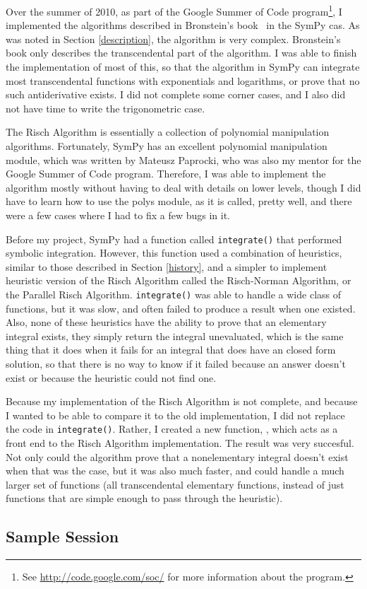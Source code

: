 Over the summer of 2010, as part of the Google Summer of Code
program\footnote{ See \url{http://code.google.com/soc/} for more
information about the program.}, I implemented the algorithms described
in Bronstein's book~\cite{bronstein2005symbolic} in the SymPy \gls{cas}.
As was noted in Section \ref{description}, the algorithm is very
complex. Bronstein's book only describes the \gls{transcendental} part
of the algorithm. I was able to finish the implementation of most of
this, so that the algorithm in SymPy can integrate most
\gls{transcendental} functions with exponentials and logarithms, or
prove that no such antiderivative exists.  I did not complete some
corner cases, and I also did not have time to write the trigonometric
case.

The Risch Algorithm is essentially a collection of polynomial
manipulation algorithms.  Fortunately, SymPy has an excellent polynomial
manipulation module, which was written by Mateusz Paprocki, who was also
my mentor for the Google Summer of Code program.  Therefore, I was able
to implement the algorithm mostly without having to deal with details on
lower levels, though I did have to learn how to use the polys module, as
it is called, pretty well, and there were a few cases where I had to fix
a few bugs in it.

Before my project, SymPy had a function called \texttt{integrate()} that
performed symbolic integration.  However, this function used a
combination of heuristics, similar to those described in Section
\ref{history}, and a simpler to implement heuristic version of the Risch
Algorithm called the Risch-Norman Algorithm, or the Parallel Risch
Algorithm.  \texttt{integrate()} was able to handle a wide class of
functions, but it was slow, and often failed to produce a result when
one existed.  Also, none of these heuristics have the ability to prove
that an \gls{elementary} integral exists, they simply return the
integral unevaluated, which is the same thing that it does when it fails
for an integral that does have an closed form solution, so that there is
no way to know if it failed because an answer doesn't exist or because
the heuristic could not find one.

Because my implementation of the Risch Algorithm is not complete, and
because I wanted to be able to compare it to the old implementation, I
did not replace the code in \texttt{integrate()}.  Rather, I created a
new function, \rischintegrate{}, which acts as a front end to the Risch
Algorithm implementation.  The result was very succesful.  Not only
could the algorithm prove that a nonelementary integral doesn't exist
when that was the case, but it was also much faster, and could handle a
much larger set of functions (all \gls{transcendental} \gls{elementary}
functions, instead of just functions that are simple enough to pass
through the heuristic).

\subsection{Sample Session} 
\label{sample} 
%